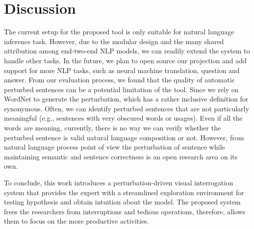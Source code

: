\section{Discussion}
The current setup for the proposed tool is only suitable for natural language inference task. However, due to the modular design and the many shared attribution among end-two-end NLP models, we can readily extend the system to handle other tasks. In the future, we plan to open source our projection and add support for more NLP tasks, such as neural machine translation, question and answer.
%
From our evaluation process, we found that the quality of automatic perturbed sentences can be a potential limitation of the tool.
Since we rely on WordNet to generate the perturbation, which has a rather inclusive definition for synonymous. Often, we can identify perturbed sentences that are not particularly meaningful (e.g., sentences with very obscured words or usages). 
Even if all the words are meaning, currently, there is no way we can verify whether the perturbed sentence is valid natural language composition or not.
%
However, from natural language process point of view the perturbation of sentence while maintaining semantic and sentence correctness is an open research area on its own. 

To conclude, this work introduces a perturbation-driven visual interrogation system that provides the expert with a streamlined exploration environment for testing hypothesis and obtain intuition about the model. The proposed system frees the researchers from interruptions and tedious operations, therefore, allows them to focus on the more productive activities.

